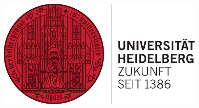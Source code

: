 \documentclass[final]{beamer}
\newlength{\onecolwid}
\begin{document}
\begin{frame}[t]
\begin{columns}[t]
\begin{column}{\onecolwid}

\begin{flushright}
\includegraphics[width=0.5\linewidth]{logo_hd.pdf}
\end{flushright}


\end{column} %

\end{columns} %

\end{frame} %
\end{document}
